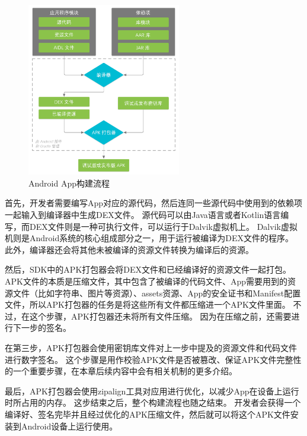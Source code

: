 \begin{figure}[htbp]
	\centering
	\includegraphics[width=0.6\textwidth]{./Figures/edwin-build-process-CHN.png}
	\caption{Android App构建流程}
	\label{fig:Android-Build-Process}
\end{figure}

首先，开发者需要编写App对应的源代码，然后连同一些源代码中使用到的依赖项一起输入到编译器中生成DEX文件。
源代码可以由Java语言或者Kotlin语言编写，而DEX文件则是一种可执行文件，可以运行于Dalvik虚拟机上。
Dalvik虚拟机则是Android系统的核心组成部分之一，用于运行被编译为DEX文件的程序。
此外，编译器还会将其他未被编译的资源文件转换为编译后的资源。

然后，SDK中的APK打包器会将DEX文件和已经编译好的资源文件一起打包。
APK文件的本质是压缩文件，其中包含了被编译的代码文件、App需要用到的资源文件（比如字符串、图片等资源）、assets资源、App的安全证书和Manifest配置文件，所以APK打包器的任务是将这些所有文件都压缩进一个APK文件里面。
不过，在这个步骤，APK打包器还未将所有文件压缩。
因为在压缩之前，还需要进行下一步的签名。

在第三步，APK打包器会使用密钥库文件对上一步中提及的资源文件和代码文件进行数字签名。
这个步骤是用作校验APK文件是否被篡改、保证APK文件完整性的一个重要步骤，在本章后续内容中会有相关机制的更多介绍。

最后，APK打包器会使用zipalign工具对应用进行优化，以减少App在设备上运行时所占用的内存。
这步结束之后，整个构建流程也随之结束。
开发者会获得一个编译好、签名完毕并且经过优化的APK压缩文件，然后就可以将这个APK文件安装到Android设备上运行使用。

